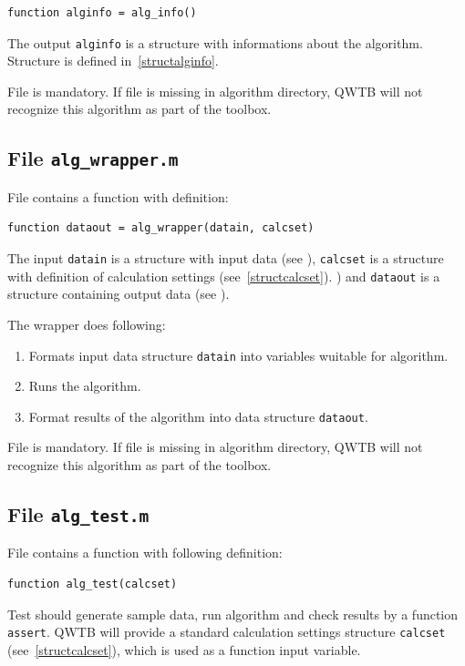 \documentclass[12pt,a4paper,oneside]{report} %
\newcommand{\li}[1]{\lstinline{#1}}     %
\begin{document}
\begin{lstlisting}
function alginfo = alg_info()
\end{lstlisting}

The output \li{alginfo} is a structure with informations about the algorithm. Structure is
defined in~\ref{structalginfo}.

File is mandatory. If file is missing in algorithm directory, QWTB will not recognize this
algorithm as part of the toolbox.

\subsection{File {\tt alg\_wrapper.m}} %
\label{filealgwrapper}
File contains a function with definition:

\begin{lstlisting}
function dataout = alg_wrapper(datain, calcset)
\end{lstlisting}

The input \li{datain} is a structure with input data (see %
), \li{calcset} is a structure with definition of calculation settings
(see~\ref{structcalcset}).
) and \li{dataout} is a structure containing output data (see %
).

The wrapper does following:
\begin{enumerate}
        \item Formats input data structure \li{datain} into variables wuitable for algorithm.
        \item Runs the algorithm.
        \item Format results of the algorithm into data structure \li{dataout}.
\end{enumerate}

File is mandatory. If file is missing in algorithm directory, QWTB will not recognize this
algorithm as part of the toolbox.

\subsection{File {\tt alg\_test.m}} %
\label{filealgtest}
File contains a function with following definition:

\begin{lstlisting}
function alg_test(calcset)
\end{lstlisting}

Test should generate sample data, run algorithm and check results by a function \li{assert}.
QWTB will provide a standard calculation settings structure \li{calcset}
(see~\ref{structcalcset}), which is used as a function input variable.
\end{document}
